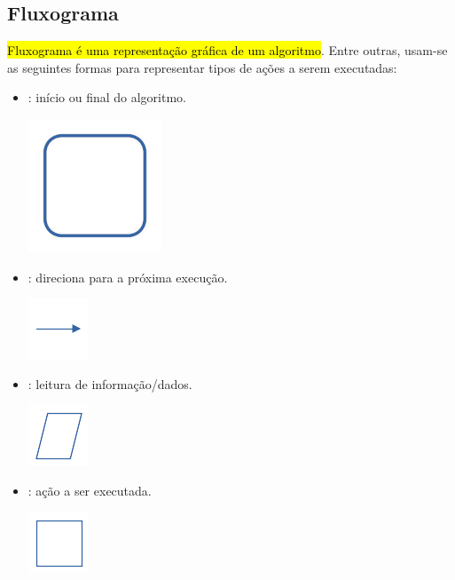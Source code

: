 \subsection{Fluxograma}

\hl{Fluxograma é uma representação gráfica de um algoritmo}. Entre outras, usam-se as seguintes formas para representar tipos de ações a serem executadas:
\begin{itemize}
\item {}: início ou final do algoritmo.
  \begin{center}
    \includegraphics{./cap_lingua/dados/fig_fluxograma/terminal.jpg}
  \end{center}  
\item {}: direciona para a próxima execução.
  \begin{center}
    \includegraphics{./cap_lingua/dados/fig_fluxograma/linha}
  \end{center}
\item {}: leitura de informação/dados.
  \begin{center}
    \includegraphics{./cap_lingua/dados/fig_fluxograma/entrada}
  \end{center}  
\item {}: ação a ser executada.
  \begin{center}
    \includegraphics{./cap_lingua/dados/fig_fluxograma/processo}
  \end{center}

\end{itemize}
